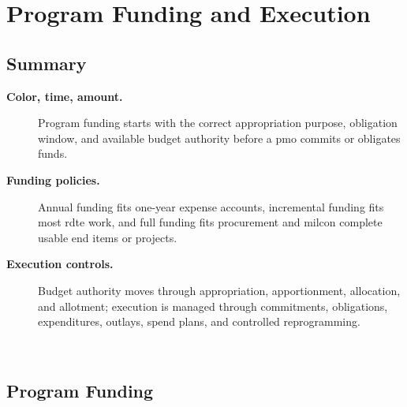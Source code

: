 \documentclass[../main.tex]{subfiles}
\begin{document}

\section{Program Funding and Execution}

\subsection{Summary}
\begin{description}
  \item[\textbf{Color, time, amount.}] Program funding starts with the correct appropriation purpose, obligation window,
  and available budget authority before a \ac{pmo} commits or obligates funds.
  \item[\textbf{Funding policies.}] Annual funding fits one-year expense accounts, incremental funding fits most
  \ac{rdte} work, and full funding fits procurement and \ac{milcon} complete usable end items or projects.
  \item[\textbf{Execution controls.}] Budget authority moves through appropriation, apportionment, allocation, and
  allotment; execution is managed through commitments, obligations, expenditures, outlays, spend plans, and controlled
  reprogramming.
\end{description}
~

\subsection{Program Funding}
\end{document}
